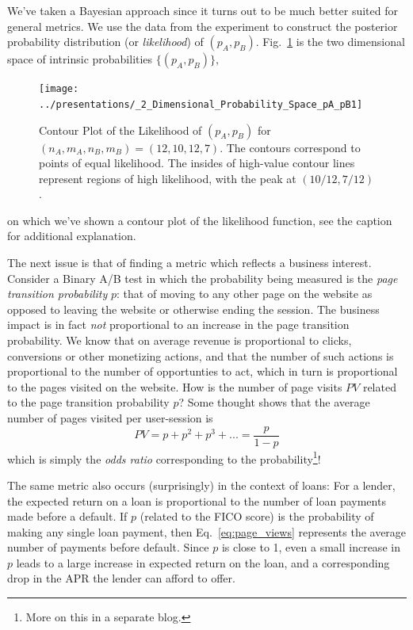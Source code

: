 \documentclass[letterpaper,12pt]{article}
\newcommand{\beq}{\begin{equation}} %
\newcommand{\eeq}{\end{equation}} %
\begin{document}
We've taken a Bayesian approach since it turns out to be much better
suited for general metrics. We use the data from the experiment to
construct the posterior probability distribution (or {\em likelihood}) of \((p_A, p_B)\). Fig.~\ref{fig:likelihood} is the two dimensional space of intrinsic probabilities \(\{(p_A,p_B)\}\),
\begin{figure}[ht!]
\centering
\texttt{[image: ../presentations/\_2\_Dimensional\_Probability\_Space\_pA\_pB1]}
\caption{Contour Plot of the Likelihood of \((p_A, p_B)\) for \((n_A,
  m_A, n_B, m_B) = (12,10,12,7)\). The contours correspond to points of equal likelihood. The insides of high-value contour
  lines represent regions of high likelihood, with
the peak at \((10/12, 7/12)\). \label{fig:likelihood}}
\end{figure}
on which we've shown a contour plot of the likelihood function, see the caption for additional explanation.

The next issue is that of finding a metric which reflects a business interest. Consider a Binary A/B
test in which the probability being measured is the {\em page
  transition probability} \(p\): that of moving to any other page
on the website as opposed to leaving the website or otherwise ending
the session. The business impact is in fact {\em not} proportional to an
increase in the page transition probability. We
know that on average revenue is proportional to clicks, conversions or other
monetizing actions, and that the number of such actions is proportional to 
the number of opportunties to act, which in turn is proportional to
the pages visited on the website. How is the number of page visits
\(PV\) related to the page transition probability \(p\)? Some
thought shows that the average number of pages visited per
user-session is
\beq\label{eq:page_views}
PV= p + p^2 + p^3 + ...= \frac{p}{1-p}
\eeq
which is simply the {\em odds ratio}
corresponding to the probability\footnote{More on this in a separate blog.}!

The same metric also occurs (surprisingly) in the context of loans:
For a lender, the expected return on a loan is proportional to the
number of loan payments made before a default. If \(p\) (related to
the FICO score) is the probability of making any single loan payment,
then Eq.~\ref{eq:page_views} represents the average number of payments
before default. Since \(p\) is close to 1, even a small increase in
\(p\) leads to a large increase in expected return on the loan, and a
corresponding drop in the APR the lender can afford to offer.
\end{document}
